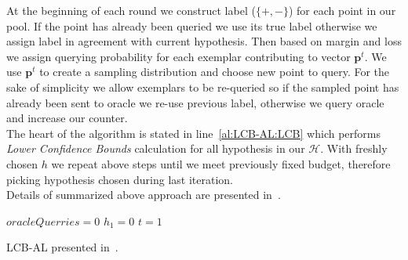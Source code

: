 \documentclass[12pt, a4paper, pdflatex, leqno]{report}
\begin{document}
At the beginning of each round we construct label ($\{+, -\}$) for each point in our pool. If the point has already been queried we use its true label otherwise we assign label in agreement with current hypothesis. Then based on margin and loss we assign querying probability for each exemplar contributing to vector $\mathbf{p}^t$. We use $\mathbf{p}^t$ to create a sampling distribution and choose new point to query. For the sake of simplicity we allow exemplars to be re-queried so if the sampled point has already been sent to oracle we re-use previous label, otherwise we query oracle and increase our counter.\\

The heart of the algorithm is stated in line~\ref{al:LCB-AL:LCB} which performs \emph{Lower Confidence Bounds} calculation for all hypothesis in our $\mathscr{H}$. With freshly chosen $h$ we repeat above steps until we meet previously fixed budget, therefore picking hypothesis chosen during last iteration.\\

Details of summarized above approach are presented in~\citep{DBLP:journals/corr/GantiG13}.\\

\vspace{2cm}
\begin{algorithm}[H]
 \LinesNumbered
 $oracleQuerries = 0$\;
 $h_1 = 0$\;
 $t = 1$\;
 \caption{LCB-AL presented in~\citep{DBLP:journals/corr/GantiG13}.\label{al:LCB-AL}}
\end{algorithm}
\vspace{2cm}
\end{document}
